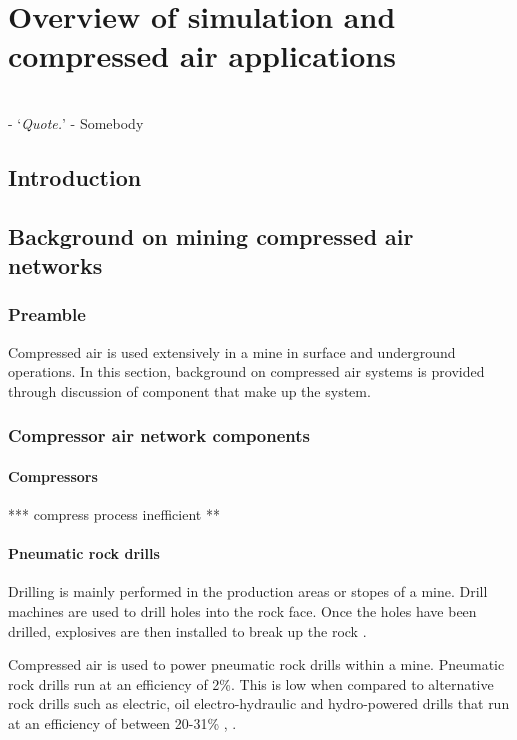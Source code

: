 \chapter{Overview of simulation and compressed air applications}
\label{Chap2}
\thispagestyle{empty}
\vspace{38em}
\hrulefill
\\-
\enquote*{\textit{Quote.}} - Somebody\\
\clearpage
\section{Introduction}
\section{Background on mining compressed air networks}
\subsection{Preamble}
Compressed air is used extensively in a mine in surface and underground operations. In this section, background on compressed air systems is provided through discussion of component that make up the system. 
\subsection{Compressor air network components}
\subsubsection{Compressors}
 ***  compress process inefficient ** 
\subsubsection{Pneumatic rock drills}
Drilling is mainly performed in the production areas or stopes of a mine. Drill machines are used to drill holes into the rock face. Once the holes have been drilled, explosives are then installed to break up the rock \cite{van2008development}.
\par
Compressed air is used to power pneumatic rock drills within a mine. Pneumatic rock drills run at an efficiency of 2\%. This is low when compared to alternative rock drills such as electric, oil electro-hydraulic and hydro-powered drills that run at an efficiency of between 20-31\% \cite{fraser2008saving}, \cite{vanTonder2010Masters}. 
